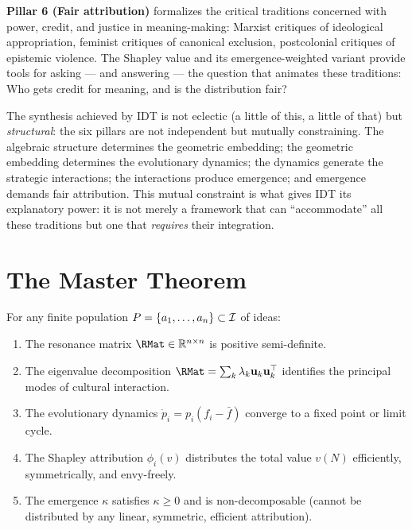 \begin{interpretation}
\textbf{Pillar 6 (Fair attribution)} formalizes the critical traditions
concerned with power, credit, and justice in meaning-making: Marxist
critiques of ideological appropriation, feminist critiques of canonical
exclusion, postcolonial critiques of epistemic violence.  The Shapley
value and its emergence-weighted variant provide tools for asking ---
and answering --- the question that animates these traditions: Who gets
credit for meaning, and is the distribution fair?

The synthesis achieved by IDT is not eclectic (a little of this, a little
of that) but \emph{structural}: the six pillars are not independent but
mutually constraining.  The algebraic structure determines the geometric
embedding; the geometric embedding determines the evolutionary dynamics;
the dynamics generate the strategic interactions; the interactions produce
emergence; and emergence demands fair attribution.  This mutual constraint
is what gives IDT its explanatory power: it is not merely a framework that
can ``accommodate'' all these traditions but one that \emph{requires}
their integration.
\end{interpretation}

\section{The Master Theorem}

\begin{theorem}
\label{thm:master}
For any finite population $P = \{a_1, \ldots, a_n\} \subset \mathcal{I}$ of ideas:
\begin{enumerate}
\item The resonance matrix $\RMat \in \mathbb{R}^{n \times n}$ is positive
  semi-definite.
\item The eigenvalue decomposition $\RMat = \sum_k \lambda_k \mathbf{u}_k
  \mathbf{u}_k^\top$ identifies the principal modes of cultural interaction.
\item The evolutionary dynamics $\dot{p}_i = p_i(f_i - \bar{f})$ converge
  to a fixed point or limit cycle.
\item The Shapley attribution $\phi_i(v)$ distributes the total value
  $v(N)$ efficiently, symmetrically, and envy-freely.
\item The emergence $\kappa$ satisfies
  $\kappa \geq 0$ and is non-decomposable (cannot be distributed by any
  linear, symmetric, efficient attribution).
\end{enumerate}
\end{theorem}

